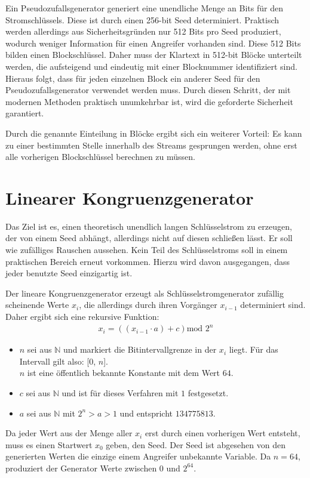 \documentclass[10pt,a4paper]{article}
\begin{document}
\medskip
Ein Pseudozufallsgenerator generiert eine unendliche Menge an Bits für den Stromschlüssels.
Diese ist durch einen 256-bit Seed determiniert.
Praktisch werden allerdings aus Sicherheitsgründen nur 512 Bits pro Seed produziert, wodurch weniger Information für einen Angreifer vorhanden sind.
Diese 512 Bits bilden einen Blockschlüssel.
Daher muss der Klartext in 512-bit Blöcke unterteilt werden, die aufsteigend und eindeutig mit einer Blocknummer identifiziert sind.
Hieraus folgt, dass für jeden einzelnen Block ein anderer Seed für den Pseudozufallsgenerator verwendet werden muss.
Durch diesen Schritt, der mit modernen Methoden praktisch unumkehrbar ist, wird die geforderte Sicherheit garantiert.

Durch die genannte Einteilung in Blöcke ergibt sich ein weiterer Vorteil:
Es kann zu einer bestimmten Stelle innerhalb des Streams gesprungen werden, ohne erst alle vorherigen Blockschlüssel berechnen zu müssen.

\section{Linearer Kongruenzgenerator}

Das Ziel ist es, einen theoretisch unendlich langen Schlüsselstrom zu erzeugen, der von einem Seed abhängt, allerdings nicht auf diesen schließen lässt.
Er soll wie zufälliges Rauschen aussehen.
Kein Teil des Schlüsselstroms soll in einem praktischen Bereich erneut vorkommen.
Hierzu wird davon ausgegangen, dass jeder benutzte Seed einzigartig ist.

\medskip
Der lineare Kongruenzgenerator erzeugt als Schlüsselstromgenerator zufällig scheinende Werte $x_i$, die allerdings durch ihren Vorgänger $x_{i-1}$ determiniert sind.
Daher ergibt sich eine rekursive Funktion:
\begin{align*}
    x_i = \left(\left(x_{i-1} \cdot a\right) + c\right) \text{mod } 2^n
\end{align*}
\begin{itemize}
    \item $n$ sei aus $\mathbb{N}$ und markiert die Bitintervallgrenze in der $x_i$ liegt.
          Für das Intervall gilt also: [0, $n$]. \\
          $n$ ist eine öffentlich bekannte Konstante mit dem Wert $64$.
    \item $c$ sei aus $\mathbb{N}$ und ist für dieses Verfahren mit $1$ festgesetzt.
    \item $a$ sei aus $\mathbb{N}$ mit $2^n>a>1$ und entspricht $134775813$.
\end{itemize}
Da jeder Wert aus der Menge aller $x_i$ erst durch einen vorherigen Wert entsteht, muss es einen Startwert $x_0$ geben, den Seed.
Der Seed ist abgesehen von den generierten Werten die einzige einem Angreifer unbekannte Variable.
Da $n = 64$, produziert der Generator Werte zwischen $0$ und $2^{64}$.
\end{document}
